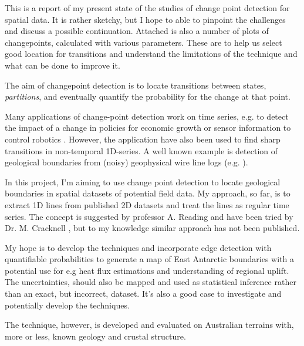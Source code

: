 This is a report of my present state of the studies of change point detection for spatial data. It is rather sketchy, but I hope to able to pinpoint the challenges and discuss a possible continuation. Attached is also a number of plots of changepoints, calculated with various parameters. These are to help us select good location for transitions and understand the limitations of the technique and what can be done to improve it.

The aim of changepoint detection is to locate transitions between states, \textit{partitions}, and eventually quantify the probability for the change at that point. 

Many applications of change-point detection work on time series, e.g. to detect the impact of a change in policies for economic growth or sensor information to control robotics \cite{Adams2007}. However, the application have also been used to find sharp transitions in non-temporal 1D-series. A well known example is detection of geological boundaries from (noisy) geophysical wire line logs (e.g. \cite{Reading2013,Gallagher2011a, Adams2007}). 

In this project, I'm aiming to use change point detection to locate geological boundaries in spatial datasets of potential field data. My approach, so far, is to extract 1D lines from published 2D datasets and treat the lines as regular time series. The concept is suggested by professor A. Reading and have been tried by Dr. M. Cracknell \cite{Cracknell2015}, but to my knowledge similar approach has not been published.

My hope is to develop the techniques and incorporate edge detection with quantifiable probabilities to generate a map of East Antarctic boundaries with a potential use for e.g heat flux estimations and understanding of regional uplift. The uncertainties, should also be mapped and used as statistical inference rather than an exact, but incorrect, dataset. It's also a good case to investigate and potentially develop the techniques. 

The technique, however, is developed and evaluated on Australian terrains with, more or less, known geology and crustal structure. 
